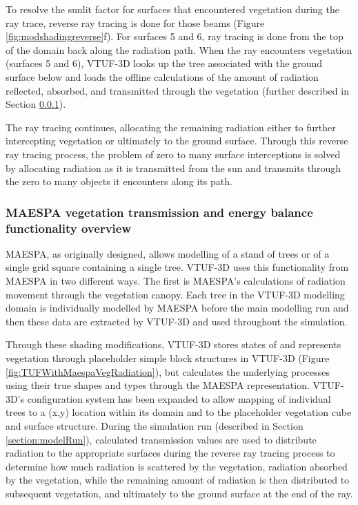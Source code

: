 \documentclass[preprint,12pt,authoryear]{elsarticle}
\begin{document}
To resolve the sunlit factor for surfaces that encountered vegetation during the ray trace, reverse ray tracing is done for those beams (Figure \ref{fig:modshadingreverse}f). For surfaces 5 and 6, ray tracing is done from the top of the domain back along the radiation path. When the ray encounters vegetation (surfaces 5 and 6), VTUF-3D looks up the tree associated with the ground surface below and loads the offline calculations of the amount of radiation reflected, absorbed, and transmitted through the vegetation (further described in Section \ref{sec:MAETrans}).


  
The ray tracing continues, allocating the remaining radiation either to further intercepting vegetation or ultimately to the ground surface. Through this reverse ray tracing process, the problem of zero to many surface interceptions is solved by allocating radiation as it is transmitted from the sun and transmits through the zero to many objects it encounters along its path. 

\subsubsection{MAESPA vegetation transmission and energy balance functionality overview}\label{sec:MAETrans}

MAESPA, as originally designed, allows modelling of a stand of trees or of a single grid square containing a single tree. VTUF-3D uses this functionality from MAESPA in two different ways. The first is MAESPA's calculations of radiation movement through the vegetation canopy. Each tree in the VTUF-3D modelling domain is individually modelled by MAESPA before the main modelling run and then these data are extracted by VTUF-3D and used throughout the simulation. 


Through these shading modifications, VTUF-3D stores states of and represents vegetation through placeholder simple block structures in VTUF-3D (Figure \ref{fig:TUFWithMaespaVegRadiation}), but calculates the underlying processes using their true shapes and types through the MAESPA representation. VTUF-3D's configuration system has been expanded to allow mapping of individual trees to a (x,y) location within its domain and to the placeholder vegetation cube and surface structure. During the simulation run (described in Section \ref{section:modelRun}), calculated transmission values are used to distribute radiation to the appropriate surfaces during the reverse ray tracing process to determine how much radiation is scattered by the vegetation, radiation absorbed by the vegetation, while the remaining amount of radiation is then distributed to subsequent vegetation, and ultimately to the ground surface at the end of the ray. 
\end{document}
